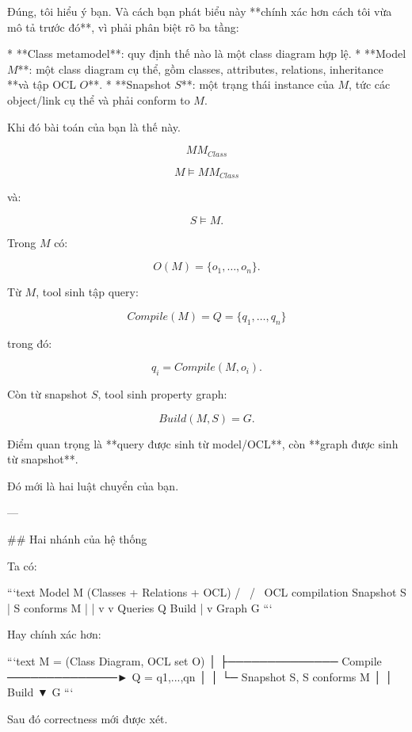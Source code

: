 Đúng, tôi hiểu ý bạn. Và cách bạn phát biểu này **chính xác hơn cách tôi vừa mô tả trước đó**, vì phải phân biệt rõ ba tầng:

* **Class metamodel**: quy định thế nào là một class diagram hợp lệ.
* **Model \(M\)**: một class diagram cụ thể, gồm classes, attributes, relations, inheritance **và tập OCL \(O\)**.
* **Snapshot \(S\)**: một trạng thái instance của \(M\), tức các object/link cụ thể và phải conform to \(M\).

Khi đó bài toán của bạn là thế này.

$$
MM_{Class}
$$

$$
M \models MM_{Class}
$$

và:

$$
S \models M.
$$

Trong \(M\) có:

$$
O(M)=\{o_1,\ldots,o_n\}.
$$

Từ \(M\), tool sinh tập query:

$$
\boxed{
Compile(M)
=
Q
=
\{q_1,\ldots,q_n\}
}
$$

trong đó:

$$
q_i = Compile(M,o_i).
$$

Còn từ snapshot \(S\), tool sinh property graph:

$$
\boxed{
Build(M,S)=G.
}
$$

Điểm quan trọng là **query được sinh từ model/OCL**, còn **graph được sinh từ snapshot**.

Đó mới là hai luật chuyển của bạn.

---

## Hai nhánh của hệ thống

Ta có:

```text
                  Model M
          (Classes + Relations + OCL)
             /                 \
            /                   \
       OCL compilation        Snapshot S
            |                  S conforms M
            |                       |
            v                       v
       Queries Q                Build
                                    |
                                    v
                               Graph G
```

Hay chính xác hơn:

```text
M = (Class Diagram, OCL set O)
│
├────────────── Compile ──────────────► Q = {q1,...,qn}
│
│
└─ Snapshot S, S conforms M
                 │
                 │ Build
                 ▼
                 G
```

Sau đó correctness mới được xét.

